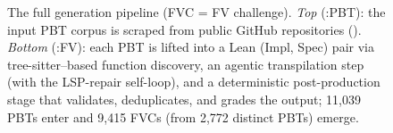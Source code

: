 \begin{figure}[t]
\caption{The full \FVSpec generation pipeline (FVC = FV challenge). \emph{Top} (\FVSpec:PBT):
the input PBT corpus is scraped from public GitHub repositories
(). \emph{Bottom} (\FVSpec:FV): each PBT is lifted into a
Lean (Impl, Spec) pair via tree-sitter--based function discovery, an
agentic transpilation step (with the LSP-repair self-loop), and a
deterministic post-production stage that validates, deduplicates, and
grades the output; 11{,}039 PBTs enter and 9{,}415 FVCs (from 2{,}772 distinct PBTs) emerge.}\vspace{-0.5em}
\label{fig:pipeline}
\end{figure}
